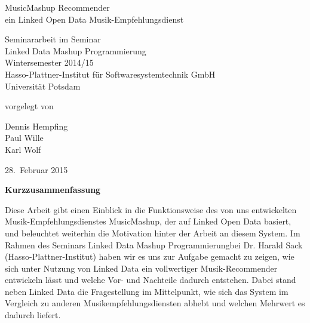 \documentclass[11pt, a4paper]{article}
\begin{document}
          
\glsaddall
\begin{titlepage}
  \begin{center} 
    \mbox{}
    \vspace{1cm}
    
    {\huge MusicMashup Recommender \\[1em] {\LARGE ein Linked Open Data Musik-Empfehlungsdienst}}  
        
    \vspace{5cm}
    
    Seminararbeit im Seminar \\[1em]
    {\large \sc Linked Data Mashup Programmierung} \\[1em]
    Wintersemester 2014/15 \\[1em]
    Hasso-Plattner-Institut für Softwaresystemtechnik GmbH \\[1em]
    Universität Potsdam
    
    \vspace{4cm}
    
		vorgelegt von
		
    \vspace{1em}
    
        {\Large Dennis Hempfing} \\
		{\Large Paul Wille} \\
		{\Large Karl Wolf}
		
    \vspace{4em}
    
    28.~Februar 2015
  \end{center}
\end{titlepage}


\setcounter{page}{1}

\begin{center}
{\bf Kurzzusammenfassung} 
\end{center}

\noindent
Diese Arbeit gibt einen Einblick in die Funktionsweise des von uns entwickelten Musik-Empfehlungsdienstes MusicMashup, der auf Linked Open Data basiert, und beleuchtet weiterhin die Motivation hinter der Arbeit an diesem System. Im Rahmen des Seminars \glqq Linked Data Mashup Programmierung\grqq bei Dr. Harald Sack (Hasso-Plattner-Institut) haben wir es uns zur Aufgabe gemacht zu zeigen, wie sich unter Nutzung von Linked Data ein vollwertiger Musik-Recommender entwickeln lässt und welche Vor- und Nachteile dadurch entstehen.
Dabei stand neben Linked Data die Fragestellung im Mittelpunkt, wie sich das System im Vergleich zu anderen Musikempfehlungsdiensten abhebt und welchen Mehrwert es dadurch liefert.
\end{document}
